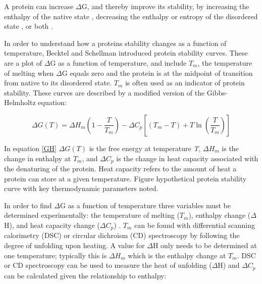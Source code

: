 {%

A protein can increase $\Delta$G, and thereby improve its stability, by 
increasing the enthalpy of the native state \cite{119}, decreasing the enthalpy or
entropy of the disordered state \cite{120,121}, or both \cite{122,123}. 

In order to understand how a proteins stability changes as a function of
temperature, Becktel and Schellman \cite{becktel1987psc} introduced protein
stability curves.  These are a plot of $\Delta$G as a function of temperature,
and include ${T}_{m}$, the temperature of melting when $\Delta$G equals zero
and the protein is at the midpoint of transition from native to its disordered
state. ${T}_{m}$ is often used as an indicator of protein stability.  These
curves are described by a modified version of the Gibbs-Helmholtz equation:

\begin{equation}\label{GH}
 \Delta G \left (  T \right )  =  \Delta  {H }_{m }  \left (  1 -  \frac{ T }{  {T }_{m } }  \right ) -  \Delta  {C }_{p } \left[   \left (  {T }_{m }  - T \right ) + T \ln  \left (   \frac{ T}{ { T}_{ m}  }  \right )  \right ] 
\end{equation}

In equation \eqref{GH} $\Delta G \left (  T \right )$ is the free energy at
temperature \emph{T}, $\Delta  {H }_{m }$ is the change in enthalpy at ${T }_{m
}$, and $\Delta  {C }_{p }$ is the change in heat capacity associated with the
denaturing of the protein. Heat capacity refers to the amount of heat a protein
can store at a given temperature.  Figure %
hypothetical protein stability curve with key thermodynamic parameters noted.

In order to find $\Delta$G as a function of temperature three variables must be
determined experimentally: the temperature of melting (${T }_{m}$), enthalpy
change ($\Delta$H), and heat capacity change ($\Delta{C}_{p}$)
\cite{pace1997mcs}. ${T}_{m}$ can be found with differential scanning
calorimetry (DSC) or circular dichroism (CD) spectroscopy by following the
degree of unfolding upon heating. A value for $\Delta$H only needs to be
determined at one temperature; typically this is $\Delta{H}_{m}$ which is the
enthalpy change at ${T}_{m}$. DSC or CD spectroscopy can be used to measure
the heat of unfolding ($\Delta$H) and $\Delta{C}_{p}$ can be calculated given the
relationship to enthalpy:

}
